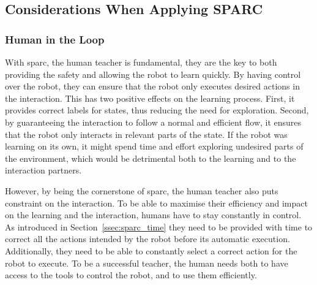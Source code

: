 

\subsection{Considerations When Applying SPARC}

\subsubsection{Human in the Loop}\label{sec:tuto_loop}
%
%
%
%

With \gls{sparc}, the human teacher is fundamental, they are the key to both providing the safety and allowing the robot to learn quickly. By having control over the robot, they can ensure that the robot only executes desired actions in the interaction. This has two positive effects on the learning process. First, it provides correct labels for states, thus reducing the need for exploration. Second, by guaranteeing the interaction to follow a normal and efficient flow, it ensures that the robot only interacts in relevant parts of the state. If the robot was learning on its own, it might spend time and effort exploring undesired parts of the environment, which would be detrimental both to the learning and to the interaction partners.

However, by being the cornerstone of \gls{sparc}, the human teacher also puts constraint on the interaction. To be able to maximise their efficiency and impact on the learning and the interaction, humans have to stay constantly in control. As introduced in Section~\ref{ssec:sparc_time} they need to be provided with time to correct all the actions intended by the robot before its automatic execution. Additionally, they need to be able to constantly select a correct action for the robot to execute. To be a successful teacher, the human needs both to have access to the tools to control the robot, and to use them efficiently.


